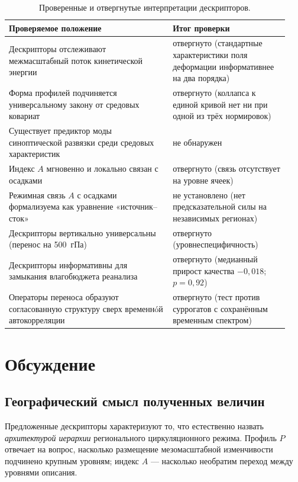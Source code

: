\documentclass[11pt,a4paper]{article}
\begin{document}
\begin{table}[t]
\centering
\caption{Проверенные и отвергнутые интерпретации дескрипторов.}
\label{tab:negative}
\small
\begin{tabular}{@{}p{0.55\linewidth}p{0.39\linewidth}@{}}
\toprule
Проверяемое положение & Итог проверки\\
\midrule
Дескрипторы отслеживают межмасштабный поток кинетической энергии & отвергнуто (стандартные характеристики поля деформации информативнее на два порядка)\\
Форма профилей подчиняется универсальному закону от средовых ковариат & отвергнуто (коллапса к единой кривой нет ни при одной из трёх нормировок)\\
Существует предиктор моды синоптической развязки среди средовых характеристик & не обнаружен\\
Индекс $A$ мгновенно и локально связан с осадками & отвергнуто (связь отсутствует на уровне ячеек)\\
Режимная связь $A$ с осадками формализуема как уравнение «источник--сток» & не установлено (нет предсказательной силы на независимых регионах)\\
Дескрипторы вертикально универсальны (перенос на 500~гПа) & отвергнуто (уровнеспецифичность)\\
Дескрипторы информативны для замыкания влагобюджета реанализа & отвергнуто (медианный прирост качества $-0{,}018$; $p=0{,}92$)\\
Операторы переноса образуют согласованную структуру сверх временнóй автокорреляции & отвергнуто (тест против суррогатов с сохранённым временным спектром)\\
\bottomrule
\end{tabular}
\end{table}

\section{Обсуждение}
\label{sec:discussion}

\subsection{Географический смысл полученных величин}

Предложенные дескрипторы характеризуют то, что естественно назвать \emph{архитектурой иерархии} регионального циркуляционного режима. Профиль $P$ отвечает на вопрос, насколько размещение мезомасштабной изменчивости подчинено крупным уровням; индекс $A$ --- насколько необратим переход между уровнями описания.
\end{document}
